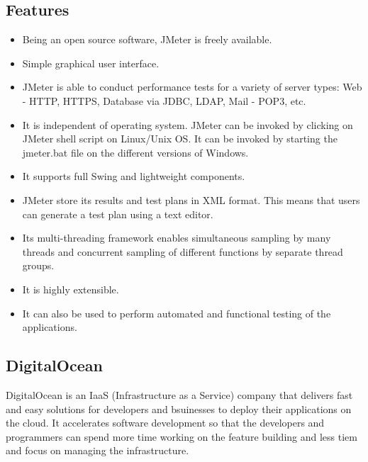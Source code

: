 \documentclass[../thesis.tex]{subfiles}
\begin{document}
\subsection*{Features}
\begin{itemize}
	\item Being an open source software, JMeter is freely available.
   
	\item Simple graphical user interface.
   
	\item JMeter is able to conduct performance tests for a variety of server types: Web - HTTP, HTTPS, Database via JDBC, LDAP, Mail - POP3, etc.
  
	\item It is independent of operating system. JMeter can be invoked by clicking on JMeter shell script on Linux/Unix OS. It can be invoked by starting the jmeter.bat file on the different versions of Windows.
    
	\item It supports full Swing and lightweight components.
   
	\item JMeter store its results and test plans in XML format. This means that users can generate a test plan using a text editor.
 
	\item Its multi-threading framework enables simultaneous sampling by many threads and concurrent sampling of different functions by separate thread groups.
   
	\item It is highly extensible.
   
	\item It can also be used to perform automated and functional testing of the applications.
    
\end{itemize}

\subsection{DigitalOcean}
DigitalOcean is an IaaS (Infrastructure as a Service) company that delivers fast and easy solutions for developers and bsuinesses to deploy their applications on the cloud. It accelerates software development so that the developers and programmers can spend more time working on the feature building and less tiem and focus on managing the infrastructure. 
\newline
\end{document}
